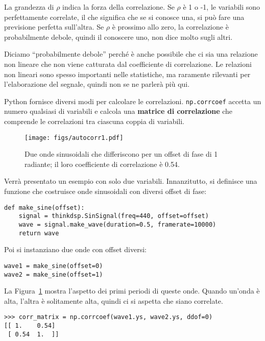 \documentclass[12pt,a4paper]{book}
\begin{document}
La grandezza di $\rho$ indica la forza della correlazione. Se $\rho$ è 1 o -1, le variabili sono perfettamente correlate, il che significa che se si conosce una, si può fare una previsione perfetta sull'altra. Se $\rho$ è prossimo allo zero, la correlazione è probabilmente debole, quindi il conoscere uno, non dice molto sugli altri.

Diciamo ``probabilmente debole'' perché è anche possibile che ci sia una relazione non lineare che non viene catturata dal coefficiente di correlazione. Le relazioni non lineari sono spesso importanti nelle statistiche, ma raramente rilevanti per l'elaborazione del segnale, quindi non se ne parlerà più qui.

Python fornisce diversi modi per calcolare le correlazioni. {\tt np.corrcoef} accetta un numero qualsiasi di variabili e calcola una {\bf matrice di correlazione} che comprende le correlazioni tra ciascuna coppia di variabili.

\begin{figure} 

\centerline{\texttt{[image: figs/autocorr1.pdf]}} \caption{Due onde sinusoidali che differiscono per un offset di fase di 1 radiante; il loro coefficiente di correlazione è 0.54.} \label{fig.autocorr1} \end{figure} 

Verrà presentato un esempio con solo due variabili. Innanzitutto, si definisce una funzione che costruisce onde sinusoidali con diversi offset di fase:

\begin{verbatim} 
def make_sine(offset):
    signal = thinkdsp.SinSignal(freq=440, offset=offset)
    wave = signal.make_wave(duration=0.5, framerate=10000)
    return wave
 \end{verbatim} 

Poi si instanziano due onde con offset diversi:

\begin{verbatim} 
wave1 = make_sine(offset=0)
wave2 = make_sine(offset=1)
 \end{verbatim} 

La Figura~\ref{fig.autocorr1} mostra l'aspetto dei primi periodi di queste onde. Quando un'onda è alta, l'altra è solitamente alta, quindi ci si aspetta che siano correlate.

\begin{verbatim} 
>>> corr_matrix = np.corrcoef(wave1.ys, wave2.ys, ddof=0)
[[ 1.    0.54]
 [ 0.54  1.  ]]
 \end{verbatim} 
\end{document}
